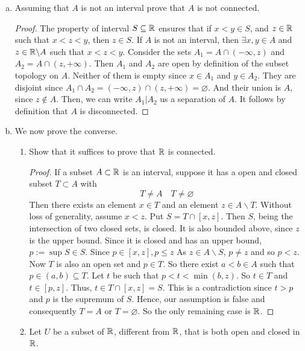 \begin{enumerate}
\begin{enumerate}[(a)]
\begin{proof}
        Thus, the subsets of $\R$ that only contain one element are also connected by definition.
        \end{proof}
        \item Assuming that $A$ is not an interval prove that $A$ is not connected.
        \begin{proof}
        The property of interval \(S\subseteq\mathbb{R}\) ensures that if \(x<y\in S\), and \(z\in\mathbb{R}\) such that \(x<z<y\), then \(z\in S\).
        If $A$ is not an interval, then \(\exists x,y\in A\) and \(z\in\mathbb{R}\backslash A\) such that \(x<z<y\).
        Consider the sets \(A_1=A\cap(-\infty,z)\) and \(A_2=A\cap(z,+\infty)\).
        Then $A_1$ and $A_2$ are open by definition of the subset topology on $A$.
        Neither of them is empty since \(x\in A_1\) and \(y\in A_2\).
        They are disjoint since \(A_1\cap A_2=(-\infty,z)\cap(z,+\infty)=\varnothing\).
        And their union is $A$, since \(z\notin A\).
        Then, we can write \(A_1|A_2\) us a separation of $A$.
        It follows by definition that $A$ is disconnected.
        \end{proof}
        \item We now prove the converse.
        \begin{enumerate}[i]
        	\item  Show that it suffices to prove that $\R$ is connected.
            \begin{proof}
            If a subset \(A\subset\mathbb{R}\) is an interval, suppose it has a open and closed subset \(T\subset A\) with
			\[ T\neq A \quad T\neq\varnothing \]
			Then there exists an element \(x\in T\) and an element \(z\in A\backslash T\).
			Without loss of generality, assume \(x<z\).
			Put \(S=T\cap[x,z]\).
			Then $S$, being the intersection of two closed sets, is closed.
			It is also bounded above, since $z$ is the upper bound.
			Since it is closed and has an upper bound, \(p:=\sup S\in S\).
			Since \(p\in[x,z],p\leq z\)
			As \(z\in A\backslash S\), \(p\neq z\) and so \(p<z\).
			Now $T$ is also an open set and \(p\in T\).
			So there exist \(a<b\in A\) such that \(p\in(a,b)\subseteq T\).
			Let $t$ be such that \(p<t<\min(b,z)\).
			So \(t\in T\) and \(t\in[p,z]\).
			Thus, \(t\in T\cap[x,z]=S\).
			This is a contradiction since \(t>p\) and $p$ is the supremum of $S$.
			Hence, our assumption is false and consequently \(T=A\) or \(T=\varnothing\).
            So the only remaining case is $\R$.
            \end{proof}
            \item Let $U$ be a subset of $\R$, different from $\R$, that is both open and closed in $\R$.

\end{enumerate}
\end{enumerate}
\end{enumerate}
